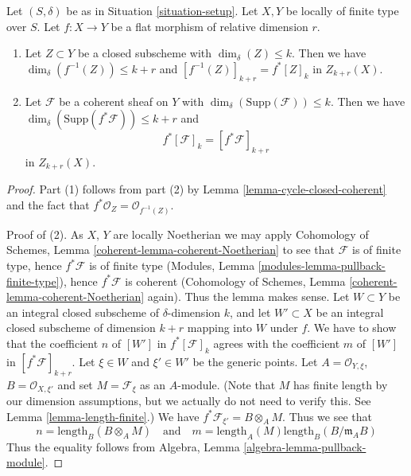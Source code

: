\begin{lemma}
\label{lemma-pullback-coherent}
Let $(S, \delta)$ be as in Situation \ref{situation-setup}.
Let $X, Y$ be locally of finite type over $S$.
Let $f : X \to Y$ be a flat morphism of relative dimension $r$.
\begin{enumerate}
\item Let $Z \subset Y$ be a closed subscheme with
$\dim_\delta(Z) \leq k$. Then we have
$\dim_\delta(f^{-1}(Z)) \leq k + r$
and $[f^{-1}(Z)]_{k + r} = f^*[Z]_k$ in $Z_{k + r}(X)$.
\item Let $\mathcal{F}$ be a coherent sheaf on $Y$ with
$\dim_\delta(\text{Supp}(\mathcal{F})) \leq k$.
Then we have $\dim_\delta(\text{Supp}(f^*\mathcal{F})) \leq k + r$
and
$$
f^*[{\mathcal F}]_k = [f^*{\mathcal F}]_{k+r}
$$
in $Z_{k + r}(X)$.
\end{enumerate}
\end{lemma}

\begin{proof}
Part (1) follows from part (2) by Lemma \ref{lemma-cycle-closed-coherent}
and the fact that $f^*\mathcal{O}_Z = \mathcal{O}_{f^{-1}(Z)}$.

\medskip\noindent
Proof of (2).
As $X$, $Y$ are locally Noetherian we may apply
Cohomology of Schemes, Lemma \ref{coherent-lemma-coherent-Noetherian} to see
that $\mathcal{F}$ is of finite type, hence $f^*\mathcal{F}$ is
of finite type (Modules, Lemma \ref{modules-lemma-pullback-finite-type}),
hence $f^*\mathcal{F}$ is coherent
(Cohomology of Schemes, Lemma \ref{coherent-lemma-coherent-Noetherian} again).
Thus the lemma makes sense. Let $W \subset Y$ be an integral closed
subscheme of $\delta$-dimension $k$, and let $W' \subset X$ be
an integral closed subscheme of dimension $k + r$ mapping into $W$
under $f$. We have to show that the coefficient $n$ of
$[W']$ in $f^*[{\mathcal F}]_k$ agrees with the coefficient
$m$ of $[W']$ in $[f^*{\mathcal F}]_{k+r}$. Let $\xi \in W$ and
$\xi' \in W'$ be the generic points. Let
$A = \mathcal{O}_{Y, \xi}$, $B = \mathcal{O}_{X, \xi'}$
and set $M = \mathcal{F}_\xi$ as an $A$-module. (Note that
$M$ has finite length by our dimension assumptions, but we
actually do not need to verify this. See
Lemma \ref{lemma-length-finite}.)
We have $f^*\mathcal{F}_{\xi'} = B \otimes_A M$.
Thus we see that
$$
n = \text{length}_B(B \otimes_A M)
\quad
\text{and}
\quad
m = \text{length}_A(M) \text{length}_B(B/\mathfrak m_AB)
$$
Thus the equality follows from
Algebra, Lemma \ref{algebra-lemma-pullback-module}.
\end{proof}



